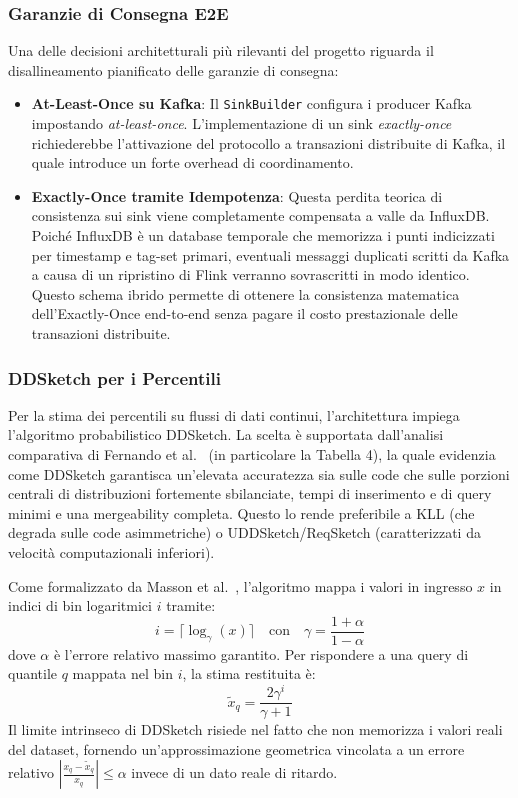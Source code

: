 \documentclass[conference]{IEEEtran}
\begin{document}
\subsubsection{Garanzie di Consegna E2E}\label{subsubsec:flink_delivery_guarantees}
Una delle decisioni architetturali più rilevanti del progetto riguarda il disallineamento pianificato delle garanzie di consegna:
\begin{itemize}
    \item \textbf{At-Least-Once su Kafka}: Il \texttt{SinkBuilder} configura i producer Kafka impostando \textit{at-least-once}. L'implementazione di un sink \textit{exactly-once} richiederebbe l'attivazione del protocollo a transazioni distribuite di Kafka, il quale introduce un forte overhead di coordinamento.
    \item \textbf{Exactly-Once tramite Idempotenza}: Questa perdita teorica di consistenza sui sink viene completamente compensata a valle da InfluxDB. Poiché InfluxDB è un database temporale che memorizza i punti indicizzati per timestamp e tag-set primari, eventuali messaggi duplicati scritti da Kafka a causa di un ripristino di Flink verranno sovrascritti in modo identico. Questo schema ibrido permette di ottenere la consistenza matematica dell'Exactly-Once end-to-end senza pagare il costo prestazionale delle transazioni distribuite.
\end{itemize}

\subsubsection{DDSketch per i Percentili}\label{subsubsec:flink_ddsketch}
Per la stima dei percentili su flussi di dati continui, l'architettura impiega l'algoritmo probabilistico DDSketch. La scelta è supportata dall'analisi comparativa di Fernando et al.~\cite{fernando2023quantiles} (in particolare la Tabella 4), la quale evidenzia come DDSketch garantisca un'elevata accuratezza sia sulle code che sulle porzioni centrali di distribuzioni fortemente sbilanciate, tempi di inserimento e di query minimi e una mergeability completa. Questo lo rende preferibile a KLL (che degrada sulle code asimmetriche) o UDDSketch/ReqSketch (caratterizzati da velocità computazionali inferiori).

Come formalizzato da Masson et al.~\cite{masson2019ddsketch}, l'algoritmo mappa i valori in ingresso $x$ in indici di bin logaritmici $i$ tramite:
\begin{equation}
    i = \lceil \log_{\gamma}(x) \rceil \quad \text{con} \quad \gamma = \frac{1 + \alpha}{1 - \alpha}
\end{equation}
dove $\alpha$ è l'errore relativo massimo garantito. Per rispondere a una query di quantile $q$ mappata nel bin $i$, la stima restituita è:
\begin{equation}
    \tilde{x}_q = \frac{2\gamma^i}{\gamma + 1}
\end{equation}
Il limite intrinseco di DDSketch risiede nel fatto che non memorizza i valori reali del dataset, fornendo un'approssimazione geometrica vincolata a un errore relativo $\left| \frac{x_q - \tilde{x}_q}{x_q} \right| \le \alpha$ invece di un dato reale di ritardo.
\end{document}
